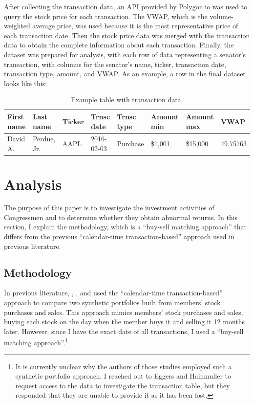 \documentclass[12pt,letterpaper]{article}
\begin{document}
After collecting the transaction data, an API provided by \url{Polygon.io} was used to query the stock price for each transaction. The VWAP, which is the volume-weighted average price, was used because it is the most representative price of each transaction date. Then the stock price data was merged with the transaction data to obtain the complete information about each transaction. Finally, the dataset was prepared for analysis, with each row of data representing a senator's transaction, with columns for the senator's name, ticker, transaction date, transaction type, amount, and VWAP. As an example, a row in the final dataset looks like this: 
\begin{table}[h]
  \centering
  \begin{tabular}{|l|l|l|l|l|l|l|l|}
  \hline
  First name & Last name & Ticker & Trnsc date & Trnsc type & Amount min & Amount max & VWAP \\ \hline
  David A. & Perdue, Jr. & AAPL & 2016-02-03 & Purchase & \$1,001 & \$15,000 & 49.75763 \\ \hline
  \end{tabular}
  \caption{Example table with transaction data.}
  \end{table}

\section{Analysis}\label{sec3}

The purpose of this paper is to investigate the investment activities of Congressmen and to determine whether they obtain abnormal returns. 
In this section, I explain the methodology, which is a ``buy-sell matching approach'' that differs from the previous ``calendar-time transaction-based'' approach used in previous literature.

\subsection{Methodology}

In previous literature, \cite{zi24}, \cite{zi11} \cite{eg13}, and \cite{eg14} used the ``calendar-time transaction-based'' approach to compare two synthetic portfolios built from members' stock purchases and sales. This approach mimics members' stock purchases and sales, buying each stock on the day when the member buys it and selling it 12 months later. However, since I have the exact date of all transactions, I used a ``buy-sell matching approach''.\footnote{It is currently unclear why the authors of those studies employed such a synthetic portfolio approach. I reached out to Eggers and Hainmuller to request access to the data to investigate the transaction table, but they responded that they are unable to provide it as it has been lost.}
\end{document}
